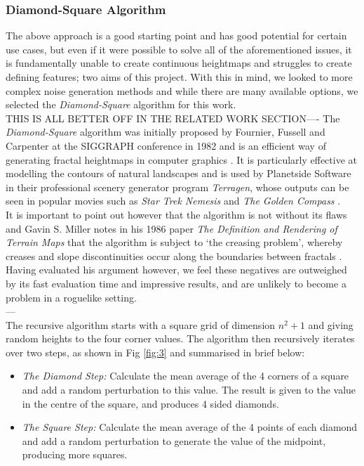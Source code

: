 \documentclass[12pt,a4paper]{article}
\begin{document}
\subsubsection{Diamond-Square Algorithm}

The above approach is a good starting point and has good potential for certain use cases, but even if it were possible to solve all of the aforementioned issues, it is fundamentally unable to create continuous heightmaps and struggles to create defining features; two aims of this project. With this in mind, we looked to more complex noise generation methods and while there are many available options, we selected the \emph{Diamond-Square} algorithm for this work. \\

THIS IS ALL BETTER OFF IN THE RELATED WORK SECTION----
The \emph{Diamond-Square} algorithm was initially proposed by Fournier, Fussell and Carpenter at the SIGGRAPH conference in 1982 and is an efficient way of generating fractal heightmaps in computer graphics \cite{FournierDSq}. It is particularly effective at modelling the contours of natural landscapes and is used by Planetside Software in their professional scenery generator program \emph{Terragen}\cite{claghorn}, whose outputs can be seen in popular movies such as \emph{Star Trek Nemesis} and \emph{The Golden Compass} \cite{planetside}. \\

It is important to point out however that the algorithm is not without its flaws and Gavin S. Miller notes in his 1986 paper \emph{The Definition and Rendering of Terrain Maps} that the algorithm is subject to `the creasing problem', whereby creases and slope discontinuities occur along the boundaries between fractals 
\cite{GMillerDiamondSq}. Having evaluated his argument however, we feel these negatives are outweighed by its fast evaluation time and impressive results, and are unlikely to become a problem in a roguelike setting. \\
---\\

The recursive algorithm starts with a square grid of dimension $n^2 + 1$ and giving random heights to the four corner values. The algorithm then recursively iterates over two steps, as shown in Fig \ref{fig:3} and summarised in brief below:

\begin{itemize}
	\item[]\emph{The Diamond Step:} Calculate the mean average of the 4 corners of a square and add a random perturbation to this value. The result is given to the value in the centre of the square, and produces 4 sided diamonds.
	\item[]\emph{The Square Step:} Calculate the mean average of the 4 points of each diamond and add a random perturbation to generate the value of the midpoint, producing more squares.
\end{itemize} 
\end{document}
